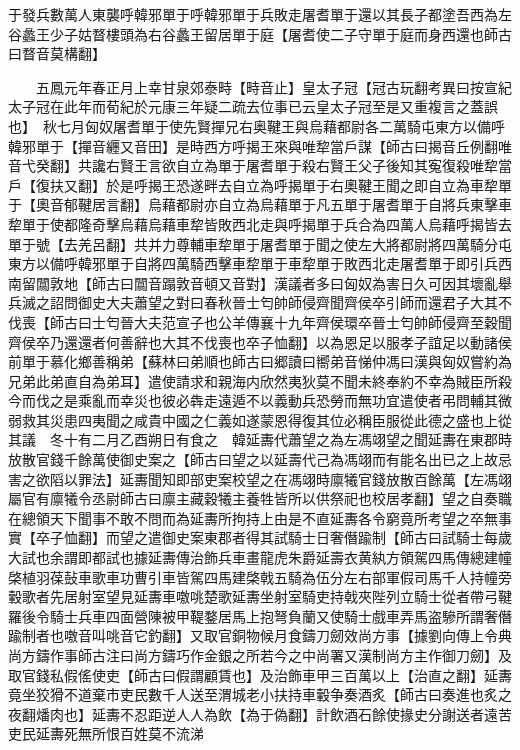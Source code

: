 于發兵數萬人東襲呼韓邪單于呼韓邪單于兵敗走屠耆單于還以其長子都塗吾西為左谷蠡王少子姑瞀樓頭為右谷蠡王留居單于庭【屠耆使二子守單于庭而身西還也師古曰瞀音莫構翻】

　　五鳳元年春正月上幸甘泉郊泰畤【畤音止】皇太子冠【冠古玩翻考異曰按宣紀太子冠在此年而荀紀於元康三年疑二疏去位事已云皇太子冠至是又重複言之蓋誤也】　秋七月匈奴屠耆單于使先賢撣兄右奥鞬王與烏藉都尉各二萬騎屯東方以備呼韓邪單于【撣音纒又音田】是時西方呼揭王來與唯犂當戶謀【師古曰揭音丘例翻唯音弋癸翻】共讒右賢王言欲自立為單于屠耆單于殺右賢王父子後知其寃復殺唯犂當戶【復扶又翻】於是呼揭王恐遂畔去自立為呼揭單于右奧鞬王聞之即自立為車犂單于【奧音郁鞬居言翻】烏藉都尉亦自立為烏藉單于凡五單于屠耆單于自將兵東擊車犂單于使都隆奇擊烏藉烏藉車犂皆敗西北走與呼揭單于兵合為四萬人烏藉呼揭皆去單于號【去羌呂翻】共并力尊輔車犂單于屠耆單于聞之使左大將都尉將四萬騎分屯東方以備呼韓邪單于自將四萬騎西擊車犂單于車犂單于敗西北走屠耆單于即引兵西南留闒敦地【師古曰闒音蹋敦音頓又音對】漢議者多曰匈奴為害日久可因其壞亂舉兵滅之詔問御史大夫蕭望之對曰春秋晉士匄帥師侵齊聞齊侯卒引師而還君子大其不伐喪【師古曰士匄晉大夫范宣子也公羊傳襄十九年齊侯環卒晉士匄帥師侵齊至穀聞齊侯卒乃還還者何善辭也大其不伐喪也卒子恤翻】以為恩足以服孝子誼足以動諸侯前單于慕化鄉善稱弟【蘇林曰弟順也師古曰郷讀曰嚮弟音悌仲馮曰漢與匈奴嘗約為兄弟此弟直自為弟耳】遣使請求和親海内欣然夷狄莫不聞未終奉約不幸為賊臣所殺今而伐之是乘亂而幸災也彼必犇走遠遁不以義動兵恐勞而無功宜遣使者弔問輔其微弱救其災患四夷聞之咸貴中國之仁義如遂蒙恩得復其位必稱臣服從此德之盛也上從其議　冬十有二月乙酉朔日有食之　韓延夀代蕭望之為左馮翊望之聞延夀在東郡時放散官錢千餘萬使御史案之【師古曰望之以延壽代己為馮翊而有能名出已之上故忌害之欲䧟以罪法】延夀聞知即部吏案校望之在馮翊時廪犧官錢放散百餘萬【左馮翊屬官有廪犧令丞尉師古曰廪主藏穀犧主養牲皆所以供祭祀也校居孝翻】望之自奏職在總領天下聞事不敢不問而為延夀所拘持上由是不直延夀各令窮竟所考望之卒無事實【卒子恤翻】而望之遣御史案東郡者得其試騎士日奢僭踰制【師古曰試騎士每歲大試也余謂即都試也據延夀傳治飾兵車畫龍虎朱爵延壽衣黄紈方領駕四馬傳總建幢棨植羽葆鼔車歌車功曹引車皆駕四馬建棨戟五騎為伍分左右部軍假司馬千人持幢旁轂歌者先居射室望見延夀車噭咷楚歌延夀坐射室騎吏持戟夾陛列立騎士從者帶弓鞬羅後令騎士兵車四面營陳被甲鞮鍪居馬上抱弩負蘭又使騎士戲車弄馬盗驂所謂奢僭踰制者也噭音叫咷音它釣翻】又取官銅物候月食鑄刀劒效尚方事【據劉向傳上令典尚方鑄作事師古注曰尚方鑄巧作金銀之所若今之中尚署又漢制尚方主作御刀劒】及取官錢私假傜使吏【師古曰假謂顧賃也】及治飾車甲三百萬以上【治直之翻】延夀竟坐狡猾不道棄市吏民數千人送至渭城老小扶持車轂争奏酒炙【師古曰奏進也炙之夜翻燔肉也】延夀不忍距逆人人為飲【為于偽翻】計飲酒石餘使掾史分謝送者遠苦吏民延夀死無所恨百姓莫不流涕

